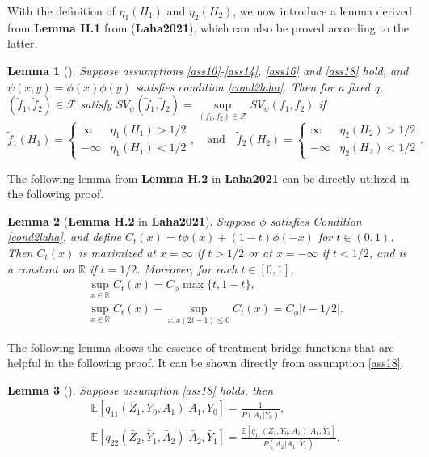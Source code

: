 \documentclass[10pt]{article}
\newtheorem{lem}{Lemma}
\theoremstyle{remark} \newtheorem{rem}{Remark}
\begin{document}
With the definition of $\eta_1(H_1)$ and $\eta_2(H_2)$, we now introduce a lemma derived from \textbf{Lemma H.1} from (\textbf{Laha2021}), which can also be proved according to the latter.
\begin{lem}[]
    Suppose assumptions \ref{ass10}-\ref{ass14}, \ref{ass16} and \ref{ass18} hold, and $\psi(x,y)=\phi(x)\phi(y)$ satisfies condition \ref{cond2laha}. Then for a fixed q, $(\tilde f_1,\tilde f_2) \in \bar{\mathcal{F}}$ satisfy $SV_\psi(\tilde f_1,\tilde f_2)=\sup\limits_{(f_1,f_2)\in \mathcal{F}} SV_\psi(f_1,f_2)$ if
    \[
    \tilde f_1(H_1) = \begin{cases}
        \infty & \eta_1(H_1) > 1/2\\
        -\infty & \eta_1(H_1) < 1/2
    \end{cases},    
    \quad \text{and} \quad
    \tilde f_2(H_2) = \begin{cases}
        \infty & \eta_2(H_2) > 1/2\\
        -\infty & \eta_2(H_2) < 1/2
    \end{cases}.
    \]
    \label{lemh1laha}
\end{lem}
The following lemma from \textbf{Lemma H.2} in \textbf{Laha2021} can be directly utilized in the following proof. 
\begin{lem}[\textbf{Lemma H.2} in \textbf{Laha2021}]
    Suppose $\phi$ satisfies Condition \ref{cond2laha}, and define $C_t(x) = t\phi(x)+(1-t)\phi(-x)$ for $t\in(0,1)$. Then $C_t(x)$ is maximized at $x=\infty$ if $t>1/2$ or at $x=-\infty$ if $t<1/2$, and is a constant on $\mathbb{R}$ if $t=1/2$. Moreover, for each $t\in[0,1]$,
    \begin{align*}
        & \sup_{x\in\mathbb R}C_t(x) = C_\phi\max\{t,1-t\}, \\
        & \sup_{x\in\mathbb R}C_t(x)-\sup_{x:x(2t-1)\leq0}C_t(x)=C_\phi|t-1/2|.
    \end{align*}
    \label{lemh2laha}
\end{lem}
The following lemma shows the essence of treatment bridge functions that are helpful in the following proof. 
It can be shown directly from assumption \ref{ass18}.
\begin{lem}[]
    Suppose assumption \ref{ass18} holds, then 
    \begin{align}
        &\mathbb{E}[q_{11}(Z_1,Y_0,A_1)|A_1,Y_0] = \frac{1}{P(A_1|Y_0)}, \\
        &\mathbb{E}[q_{22}(\bar Z_2,\bar Y_1,\bar A_2)|\bar A_2, \bar Y_1] = \frac{\mathbb{E}[q_{11}(Z_1,Y_0,A_1)|A_1,\bar Y_1]}{P(A_2|A_1,\bar Y_1)}.
    \end{align}
    \label{lemass18}
\end{lem}
\end{document}
